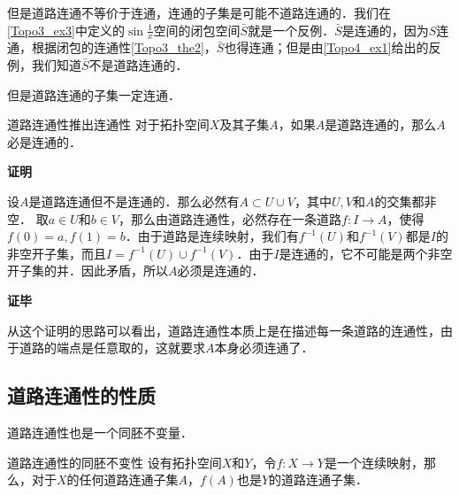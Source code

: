 但是道路连通不等价于连通，连通的子集是可能不道路连通的．我们在\autoref{Topo3_ex3}中定义的$\sin{\frac{1}{x}}$空间的闭包空间$\bar{S}$就是一个反例．$\bar{S}$是连通的，因为$S$连通，根据闭包的连通性\autoref{Topo3_the2}，$\bar{S}$也得连通；但是由\autoref{Topo4_ex1}给出的反例，我们知道$\bar{S}$不是道路连通的．

但是道路连通的子集一定连通．

\begin{theorem}{道路连通性推出连通性}\label{Topo4_the1}
对于拓扑空间$X$及其子集$A$，如果$A$是道路连通的，那么$A$必是连通的．
\end{theorem}

\textbf{证明}

设$A$是道路连通但不是连通的．那么必然有$A\subset U\cup V$，其中$U, V$和$A$的交集都非空．
取$a\in U$和$b\in V$，那么由道路连通性，必然存在一条道路$f:I\rightarrow A$，使得$f(0)=a, f(1)=b$．由于道路是连续映射，我们有$f^{-1}(U)$和$f^{-1}(V)$都是$I$的非空开子集，而且$I=f^{-1}(U)\cup f^{-1}(V)$．由于$I$是连通的，它不可能是两个非空开子集的并．因此矛盾，所以$A$必须是连通的．

\textbf{证毕}

从这个证明的思路可以看出，道路连通性本质上是在描述每一条道路的连通性，由于道路的端点是任意取的，这就要求$A$本身必须连通了．

\subsection{道路连通性的性质}

道路连通性也是一个同胚不变量．

\begin{theorem}{道路连通性的同胚不变性}
设有拓扑空间$X$和$Y$，令$f:X\rightarrow Y$是一个连续映射，那么，对于$X$的任何道路连通子集$A$，$f(A)$也是$Y$的道路连通子集．
\end{theorem}
